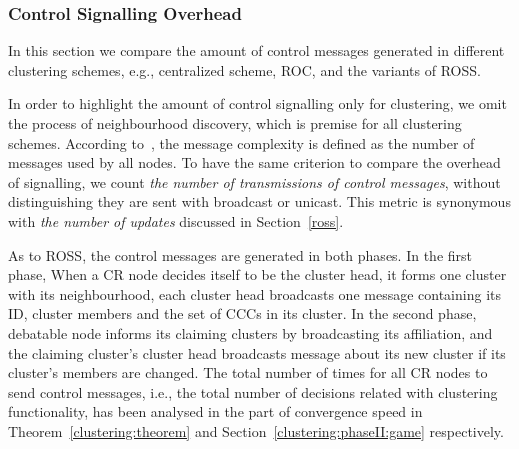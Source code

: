 \documentclass[10pt,journal,compsoc]{IEEEtran}
\theoremstyle{mytheoremstyle}
\theoremstyle{mytheoremstyle}
\theoremstyle{mytheoremstyle}
\newcommand{\eg}{e.g., }
\newcommand{\ie}{i.e., }
\begin{document}
\subsubsection{Control Signalling Overhead}

In this section we compare the amount of control messages generated in different clustering schemes, \eg centralized scheme, ROC, and the variants of ROSS.

In order to highlight the amount of control signalling only for clustering, we omit the process of neighbourhood discovery, which is premise for all clustering schemes.
According to~\cite{complexity_aggregation_2011}, the message complexity is defined as the number of messages used by all nodes.
To have the same criterion to compare the overhead of signalling, we count \textit{the number of transmissions of control messages}, without distinguishing they are sent with broadcast or unicast.
This metric is synonymous with \textit{the number of updates} discussed in Section~\ref{ross}.

As to ROSS, the control messages are generated in both phases.
In the first phase, %
When a CR node decides itself to be the cluster head, it forms one cluster with its neighbourhood, 
each cluster head broadcasts one message containing its ID, cluster members and the set of CCCs in its cluster.
In the second phase, %
debatable node informs its claiming clusters by broadcasting its affiliation, and the claiming cluster's cluster head broadcasts message about its new cluster if its cluster's members are changed.
The total number of times for all CR nodes to send control messages, \ie the total number of decisions related with clustering functionality, has been analysed in the part of convergence speed in Theorem~\ref{clustering:theorem} and Section~\ref{clustering:phaseII:game} respectively.
\end{document}
